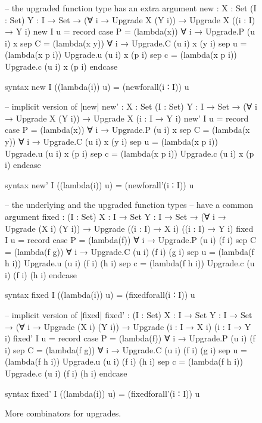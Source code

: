 \begin{figure}
\setlength{\mathindent}{0em}
\begin{code}
-- the upgraded function type has an extra argument
new :  {X : Set} (I : Set) {Y : I → Set} →
       (∀ i → Upgrade X (Y i)) → Upgrade X ((i : I) → Y i)
new I u = record  case  P  =  (lambda(x)) ∀ i → Upgrade.P (u i) x
                  sep   C  =  (lambda(x y)) ∀ i → Upgrade.C (u i) x (y i)
                  sep   u  =  (lambda(x p i)) Upgrade.u  (u i) x (p i)
                  sep   c  =  (lambda(x p i)) Upgrade.c  (u i) x (p i) endcase

syntax new I ((lambda(i)) u) = (newforall(i ∶ I)) u

-- implicit version of |new|
new' :  {X : Set} (I : Set) {Y : I → Set} →
        (∀ i → Upgrade X (Y i)) → Upgrade X ({i : I} → Y i)
new' I u = record  case  P  =  (lambda(x)) ∀ {i} → Upgrade.P (u i) x
                   sep   C  =  (lambda(x y)) ∀ {i} → Upgrade.C (u i) x (y {i})
                   sep   u  =  (lambda(x p {i})) Upgrade.u  (u i) x (p {i})
                   sep   c  =  (lambda(x p {i})) Upgrade.c  (u i) x (p {i}) endcase

syntax new' I ((lambda(i)) u) = (newforall'(i ∶ I)) u

-- the underlying and the upgraded function types
-- have a common argument
fixed :  (I : Set) {X : I → Set} {Y : I → Set} →
         (∀ i → Upgrade (X i) (Y i)) → Upgrade ((i : I) → X i) ((i : I) → Y i)
fixed I u = record  case  P  =  (lambda(f)) ∀ i → Upgrade.P (u i) (f i)
                    sep   C  =  (lambda(f g)) ∀ i → Upgrade.C (u i) (f i) (g i)
                    sep   u  =  (lambda(f h i)) Upgrade.u  (u i) (f i) (h i)
                    sep   c  =  (lambda(f h i)) Upgrade.c  (u i) (f i) (h i) endcase

syntax fixed I ((lambda(i)) u) = (fixedforall(i ∶ I)) u

-- implicit version of |fixed|
fixed' :  (I : Set) {X : I → Set} {Y : I → Set} →
          (∀ i → Upgrade (X i) (Y i)) → Upgrade ({i : I} → X i) ({i : I} → Y i)
fixed' I u = record  case  P     =  (lambda(f)) ∀ {i} → Upgrade.P (u i) (f {i})
                     sep   C     =  (lambda(f g)) ∀ {i} → Upgrade.C (u i) (f {i}) (g {i})
                     sep   u     =  (lambda(f h {i})) Upgrade.u  (u i) (f {i}) (h {i}) 
                     sep   c     =  (lambda(f h {i})) Upgrade.c  (u i) (f {i}) (h {i}) endcase

syntax fixed' I ((lambda(i)) u) = (fixedforall'(i ∶ I)) u
\end{code}
\caption{More combinators for upgrades.}
\label{fig:upgrade-combinators}
\end{figure}

